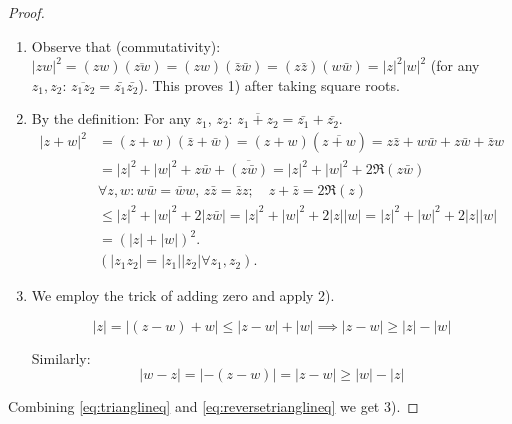 \begin{proof}
    \begin{enumerate}
        \item Observe that (commutativity):
        $\lvert z w \rvert^2 = (zw)(\overline{zw}) = (zw)(\bar{z}\bar{w}) = (z\bar{z})(w\bar{w}) = \lvert z\rvert^2 \lvert w \rvert ^2 $ (for any $z_1,z_2$: $\overline{z_1z_2}=\bar{z_1}\bar{z_2}$).
        This proves 1) after taking square roots.
        
        \item By the definition:
        For any $z_1$, $z_2$: $\overline{z_1+z_2} = \bar{z_1}+\bar{z_2}$.
        \begin{equation*}            
            \begin{aligned}
                 \lvert z+ w \rvert^2 &= (z+w)(\bar{z}+\bar{w}) = (z+w)(\overline{z+w}) = z\bar{z} + w\bar{w} + z\bar{w} + \bar{z}w \\
                &= \lvert z\rvert^2 +  \lvert w \rvert ^2 + z\bar{w} + \overline{(z\bar{w})} = \lvert z\rvert^2+ \lvert w \rvert ^2 + 2\Re(z\bar{w}) \\                  
                & \boxed{\forall z, w : w\bar{w} = \bar{w}w, \, z\bar{z} = \bar{z}z; \quad  z+\bar{z} = 2\Re(z)} \\
                & \leq \lvert z\rvert^2+ \lvert w \rvert ^2+2 \lvert z\bar{w}\rvert = \lvert z\rvert^2+ \lvert w \rvert ^2+2\lvert z\rvert  \lvert w   \rvert = \lvert z\rvert^2+ \lvert w \rvert ^2+2\lvert z\rvert \lvert w  \rvert \\
                &= (\lvert z\rvert+ \lvert w \rvert )^2. \\
                & \boxed{(\lvert z_1z_2\rvert =\lvert z_1\rvert \lvert z_2 \rvert  \forall z_1, z_2).}
            \end{aligned}
            \end{equation*}
        \item We employ the trick of adding zero and apply 2).
        
        \begin{equation}\label{eq:trianglineq} \tag{4}
        \lvert z\rvert =\lvert (z-w)+w\rvert \leq\lvert z- w \rvert+ \lvert w  \rvert \implies \lvert z- w \rvert \geq \lvert z\rvert- \lvert w   \rvert  
    \end{equation} 

        Similarly: 
        \begin{equation} \label{eq:reversetrianglineq} \tag{5}
            \lvert w-z\rvert = \lvert -(z-w)\rvert = \lvert z-w\rvert \geq  \lvert w \rvert -\lvert z\rvert 
        \end{equation}  
        
    \end{enumerate}
Combining \ref{eq:trianglineq} and \ref{eq:reversetrianglineq} we get 3).
\end{proof}
